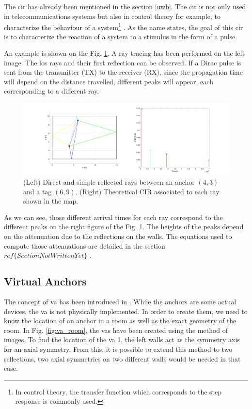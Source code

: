 The \gls{cir} has already been mentioned in the section \ref{uwb}. The \gls{cir} is not only used in telecommunications systems but also in control theory for example, to characterize the behaviour of a system\footnote{In control theory, the transfer function which corresponds to the step response is commonly used.} \cite{garonne2019course}. As the name states, the goal of this \gls{cir} is to characterize the reaction of a system to a stimulus in the form of a pulse.
\vspace{2mm}

An example is shown on the Fig. \ref{fig:cir_ex1}. A ray tracing has been performed on the left image. The \gls{los} rays and their first reflection can be observed. If a Dirac pulse is sent from the transmitter (TX) to the receiver (RX), since the propagation time will depend on the distance travelled, different peaks will appear, each corresponding to a different ray.

\begin{figure}[H]
	\centering
	\includegraphics[width=1\linewidth]{Images/Anchor-mpc.jpg}
	\caption{(Left) Direct and simple reflected rays between an anchor $(4, 3)$ and a tag $(6, 9)$. (Right) Theoretical CIR associated to each ray shown in the map. 	\label{fig:cir_ex1}}

\end{figure}

As we can see, those different arrival times for each ray correspond to the different peaks on the right figure of the Fig. \ref{fig:cir_ex1}. The heights of the peaks depend on the attenuation due to the reflections on the walls. The equations used to compute those attenuations are detailed in the section \color{red} $ref\{SectionNotWrittenYet\}$ \color{black}. 

\subsection{Virtual Anchors}

The concept of \gls{va} has been introduced in  \cite{meissner2010uwb}. While the anchors are some actual devices, the \gls{va} is not physically implemented. In order to create them, we need to know the location of an anchor in a room as well as the exact geometry of the room. In Fig. \ref{fig:va_room}, the \glspl{va} have been created using the method of images. To find the location of the \gls{va} 1, the left walls act as the symmetry axis for an axial symmetry. From this, it is possible to extend this method to two reflections, two axial symmetries on two different walls would be needed in that case.

